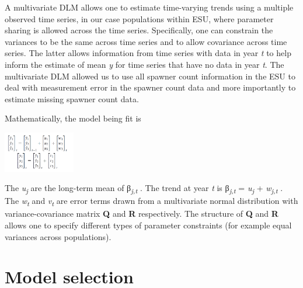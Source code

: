 \documentclass[
  letterpaper,
  oneside,
  open=any]{scrbook}
\begin{document}
A multivariate DLM allows one to estimate time-varying trends using a
multiple observed time series, in our case populations within ESU, where
parameter sharing is allowed across the time series. Specifically, one
can constrain the variances to be the same across time series and to
allow covariance across time series. The latter allows information from
time series with data in year \emph{t} to help inform the estimate of
mean \emph{y} for time series that have no data in year \emph{t}. The
multivariate DLM allowed us to use all spawner count information in the
ESU to deal with measurement error in the spawner count data and more
importantly to estimate missing spawner count data.

Mathematically, the model being fit is

\includegraphics[width=1.23in,height=\textheight]{content/../media/image4.png}

The \emph{u\textsubscript{j}} are the long-term mean of
β\emph{\textsubscript{j,t}} . The trend at year \emph{t} is
β\emph{\textsubscript{j,t}} = \emph{u\textsubscript{j}} +
\emph{w\textsubscript{j,t}} . The \emph{w\textsubscript{t}} and
\emph{v\textsubscript{t} } are error terms drawn from a multivariate
normal distribution with variance-covariance matrix \textbf{Q} and
\textbf{R} respectively. The structure of \textbf{Q} and \textbf{R}
allows one to specify different types of parameter constraints (for
example equal variances across populations).

\hypertarget{model-selection}{%
\section{Model selection}\label{model-selection}}
\end{document}
